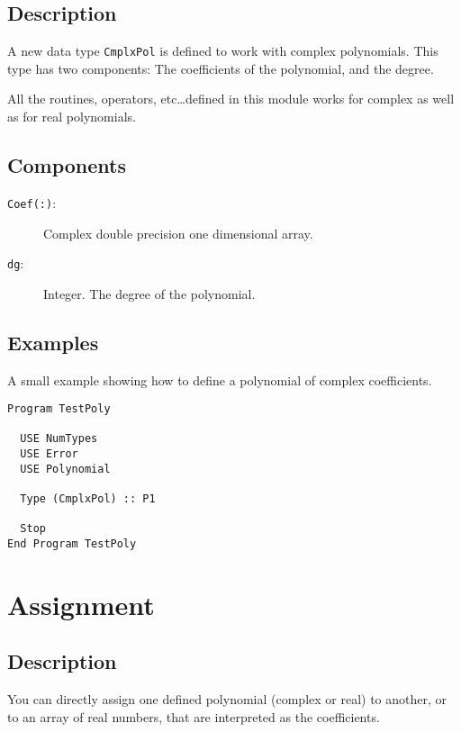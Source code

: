 \subsection{Description}

A new data type \texttt{CmplxPol} is defined to work with complex
polynomials. This type has two components: The coefficients of the
polynomial, and the degree. 

All the routines, operators, etc\dots defined in this module works for
complex as well as for real polynomials.

\subsection{Components}

\begin{description}
\item[\texttt{Coef(:)}: ] Complex double precision one dimensional
  array.
\item[\texttt{dg}:] Integer. The degree of the polynomial.
\end{description}

\subsection{Examples}

A small example showing how to define a polynomial of complex coefficients.

\begin{lstlisting}[emph=Type,
                   emphstyle=\color{blue},
                   frame=trBL,
                   caption=Defining a polynomial.,
                   label=typepolC]
Program TestPoly

  USE NumTypes
  USE Error
  USE Polynomial

  Type (CmplxPol) :: P1

  Stop
End Program TestPoly
\end{lstlisting}

\section{Assignment}

\subsection{Description}

You can directly assign one defined polynomial (complex or real) to
another, or to an array of real numbers, that are interpreted as the
coefficients. 

